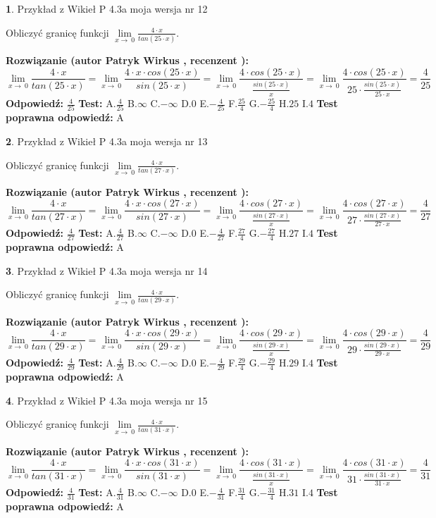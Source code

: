 \documentclass[12pt, a4paper]{article}
\theoremstyle{definition} %
\newtheorem{zad}{}
\newcommand{\zadStart}[1]{\begin{zad}#1\newline}
\newcommand{\zadStop}{\end{zad}}
\newcommand{\rozwStart}[2]{\noindent \textbf{Rozwiązanie (autor #1 , recenzent #2): }\newline}
\newcommand{\rozwStop}{\newline}
\newcommand{\odpStart}{\noindent \textbf{Odpowiedź:}\newline}
\newcommand{\odpStop}{\newline}
\newcommand{\testStart}{\noindent \textbf{Test:}\newline}
\newcommand{\testStop}{\newline}
\newcommand{\kluczStart}{\noindent \textbf{Test poprawna odpowiedź:}\newline}
\newcommand{\kluczStop}{\newline}
\begin{document}
\zadStart{Przykład z Wikieł P 4.3a moja wersja nr 12}


Obliczyć granicę funkcji $\lim\limits_{x\to\ 0}\frac{4 \cdot x}{tan(25 \cdot x)}$.
\zadStop
\rozwStart{Patryk Wirkus}{}
$$\lim\limits_{x\to\ 0}\frac{4 \cdot x}{tan(25 \cdot x)}=\lim\limits_{x\to\ 0}\frac{4 \cdot x \cdot cos(25 \cdot x)}{sin(25 \cdot x)}=\lim\limits_{x\to\ 0}\frac{4 \cdot cos(25 \cdot x)}{\frac{sin(25 \cdot x)}{x}}=\lim\limits_{x\to\ 0}\frac{4 \cdot cos(25 \cdot x)}{25 \cdot \frac{sin(25 \cdot x)}{25 \cdot x}} = \frac{4}{25}$$
\rozwStop
\odpStart
$\frac{4}{25}$
\odpStop
\testStart
A.$\frac{4}{25}$
B.$\infty$
C.$-\infty$
D.$0$
E.$-\frac{4}{25}$
F.$\frac{25}{4}$
G.$-\frac{25}{4}$
H.$25$
I.$4$
\testStop
\kluczStart
A
\kluczStop



\zadStart{Przykład z Wikieł P 4.3a moja wersja nr 13}


Obliczyć granicę funkcji $\lim\limits_{x\to\ 0}\frac{4 \cdot x}{tan(27 \cdot x)}$.
\zadStop
\rozwStart{Patryk Wirkus}{}
$$\lim\limits_{x\to\ 0}\frac{4 \cdot x}{tan(27 \cdot x)}=\lim\limits_{x\to\ 0}\frac{4 \cdot x \cdot cos(27 \cdot x)}{sin(27 \cdot x)}=\lim\limits_{x\to\ 0}\frac{4 \cdot cos(27 \cdot x)}{\frac{sin(27 \cdot x)}{x}}=\lim\limits_{x\to\ 0}\frac{4 \cdot cos(27 \cdot x)}{27 \cdot \frac{sin(27 \cdot x)}{27 \cdot x}} = \frac{4}{27}$$
\rozwStop
\odpStart
$\frac{4}{27}$
\odpStop
\testStart
A.$\frac{4}{27}$
B.$\infty$
C.$-\infty$
D.$0$
E.$-\frac{4}{27}$
F.$\frac{27}{4}$
G.$-\frac{27}{4}$
H.$27$
I.$4$
\testStop
\kluczStart
A
\kluczStop



\zadStart{Przykład z Wikieł P 4.3a moja wersja nr 14}


Obliczyć granicę funkcji $\lim\limits_{x\to\ 0}\frac{4 \cdot x}{tan(29 \cdot x)}$.
\zadStop
\rozwStart{Patryk Wirkus}{}
$$\lim\limits_{x\to\ 0}\frac{4 \cdot x}{tan(29 \cdot x)}=\lim\limits_{x\to\ 0}\frac{4 \cdot x \cdot cos(29 \cdot x)}{sin(29 \cdot x)}=\lim\limits_{x\to\ 0}\frac{4 \cdot cos(29 \cdot x)}{\frac{sin(29 \cdot x)}{x}}=\lim\limits_{x\to\ 0}\frac{4 \cdot cos(29 \cdot x)}{29 \cdot \frac{sin(29 \cdot x)}{29 \cdot x}} = \frac{4}{29}$$
\rozwStop
\odpStart
$\frac{4}{29}$
\odpStop
\testStart
A.$\frac{4}{29}$
B.$\infty$
C.$-\infty$
D.$0$
E.$-\frac{4}{29}$
F.$\frac{29}{4}$
G.$-\frac{29}{4}$
H.$29$
I.$4$
\testStop
\kluczStart
A
\kluczStop



\zadStart{Przykład z Wikieł P 4.3a moja wersja nr 15}


Obliczyć granicę funkcji $\lim\limits_{x\to\ 0}\frac{4 \cdot x}{tan(31 \cdot x)}$.
\zadStop
\rozwStart{Patryk Wirkus}{}
$$\lim\limits_{x\to\ 0}\frac{4 \cdot x}{tan(31 \cdot x)}=\lim\limits_{x\to\ 0}\frac{4 \cdot x \cdot cos(31 \cdot x)}{sin(31 \cdot x)}=\lim\limits_{x\to\ 0}\frac{4 \cdot cos(31 \cdot x)}{\frac{sin(31 \cdot x)}{x}}=\lim\limits_{x\to\ 0}\frac{4 \cdot cos(31 \cdot x)}{31 \cdot \frac{sin(31 \cdot x)}{31 \cdot x}} = \frac{4}{31}$$
\rozwStop
\odpStart
$\frac{4}{31}$
\odpStop
\testStart
A.$\frac{4}{31}$
B.$\infty$
C.$-\infty$
D.$0$
E.$-\frac{4}{31}$
F.$\frac{31}{4}$
G.$-\frac{31}{4}$
H.$31$
I.$4$
\testStop
\kluczStart
A
\kluczStop
\end{document}
